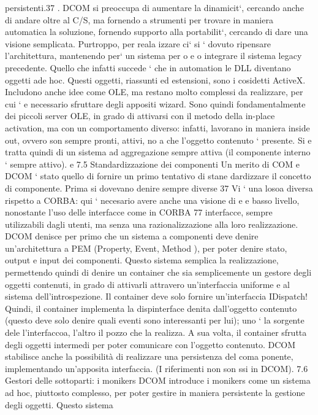 \documentclass[a4paper,12pt]{article}
\begin{document}
persistenti.37 . DCOM si preoccupa
di aumentare la dinamicit`, cercando anche di andare oltre al C/S, ma fornendo
a
strumenti per trovare in maniera automatica la soluzione, fornendo supporto
alla portabilit`, cercando di dare una visione semplicata. Purtroppo, per reala
izzare ci` si ` dovuto ripensare l'architettura, mantenendo per` un sistema per
o e
o
integrare il sistema legacy precedente.
Quello che infatti succede ` che in automation le DLL diventano oggetti ade
hoc. Questi oggetti, riassunti ed estensioni, sono i cosidetti ActiveX. Includono
anche idee come OLE, ma restano molto complessi da realizzare, per cui `
e
necessario sfruttare degli appositi wizard. Sono quindi fondamentalmente dei
piccoli server OLE, in grado di attivarsi con il metodo della in-place activation,
ma con un comportamento diverso: infatti, lavorano in maniera inside out,
ovvero son sempre pronti, attivi, no a che l'oggetto contenuto ` presente. Si
e
tratta quindi di un sistema ad aggregazione sempre attiva (il componente interno
` sempre attivo).
e
7.5
Standardizzazione dei componenti
Un merito di COM e DCOM ` stato quello di fornire un primo tentativo di stane
dardizzare il concetto di componente. Prima si dovevano denire sempre diverse
37 Vi ` una losoa diversa rispetto a CORBA: qui ` necesario avere anche una visione di
e
e
basso livello, nonostante l'uso delle interfacce come in CORBA
77
interfacce, sempre utilizzabili dagli utenti, ma senza una razionalizzazione alla
loro realizzazione.
DCOM denisce per primo che un sistema a componenti deve denire un'architettura a PEM (Property, Event, Method ), per
poter denire stato, output
e input dei componenti. Questo sistema semplica la realizzazione, permettendo quindi di denire un container che sia
semplicemente un gestore degli oggetti
contenuti, in grado di attivarli attravero un'interfaccia uniforme e al sistema dell'introspezione. Il container deve
solo fornire un'interfaccia IDispatch! Quindi,
il container implementa la dispinterface denita dall'oggetto contenuto (questo
deve solo denire quali eventi sono interessanti per lui); uno ` la sorgente dele
l'interfaccoa, l'altro il pozzo che la realizza. A sua volta, il container sfrutta
degli oggetti intermedi per poter comunicare con l'oggetto contenuto.
DCOM stabilisce anche la possibilità di realizzare una persistenza del coma
ponente, implementando un'apposita interfaccia. (I riferimenti non son ssi in
DCOM).
7.6
Gestori delle sottoparti: i monikers
DCOM introduce i monikers come un sistema ad hoc, piuttosto complesso, per
poter gestire in maniera persistente la gestione degli oggetti. Questo sistema
\end{document}

